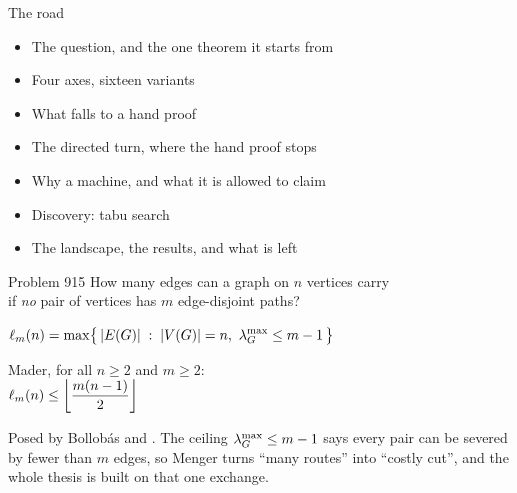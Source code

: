 \documentclass[aspectratio=1610,11pt]{beamer}
\begin{document}

\begin{frame}{The road}
\vfill
\begin{itemize}\setlength{\itemsep}{9pt}
  \item[\color{KULblauw1}\textbf{1}] The question, and the one theorem it starts from
  \item[\color{KULblauw1}\textbf{2}] Four axes, sixteen variants
  \item[\color{KULblauw1}\textbf{3}] What falls to a hand proof
  \item[\color{KULblauw1}\textbf{4}] The directed turn, where the hand proof stops
  \item[\color{KULblauw1}\textbf{5}] Why a machine, and what it is allowed to claim
  \item[\color{KULblauw1}\textbf{6}] Discovery: tabu search
  \item[\color{KULblauw1}\textbf{7}] The landscape, the results, and what is left
\end{itemize}
\vfill
\end{frame}


\begin{frame}{\Erdos{} Problem 915}
\vfill
\centering
{\large How many edges can a graph on $n$ vertices carry}\\[2pt]
{\large if \emph{no} pair of vertices has $m$ edge-disjoint paths?}

\vspace{14pt}
{\color{KULblauw3b}\Large $\displaystyle \ell_m(n)=\max\bigl\{\,|E(G)| \;:\; |V(G)|=n,\ \lambda^{\max}_G\le m-1\,\bigr\}$}

\vspace{16pt}
\begin{minipage}{0.66\textwidth}
\centering
{\color{black!45}\small Mader, for all $n\ge2$ and $m\ge2$:}\\[6pt]
{\color{KULblauw1}\Large $\displaystyle \ell_m(n)\le\left\lfloor \frac{m(n-1)}{2}\right\rfloor$}
\end{minipage}

\vspace{16pt}
{\footnotesize\color{black!60} Posed by Bollob\'{a}s and \Erdos. The ceiling $\lambda^{\max}_G\le m-1$ says every pair can be severed by fewer than $m$ edges, so Menger turns ``many routes'' into ``costly cut'', and the whole thesis is built on that one exchange.}
\vfill
\end{frame}
\end{document}
